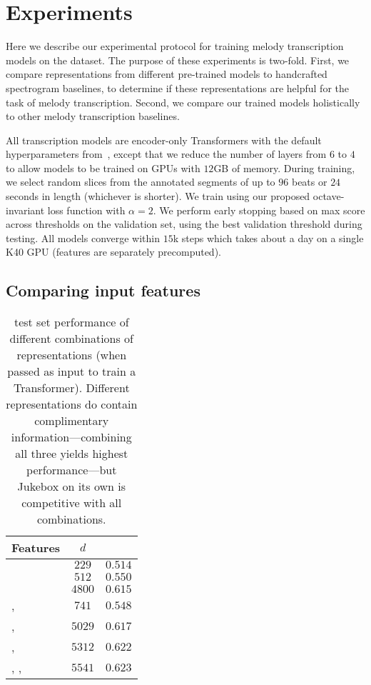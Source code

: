 \section{Experiments}
\label{sec:experiments}

Here we describe our experimental protocol for training melody transcription models on the \hooktheory{} dataset. 
The purpose of these experiments is two-fold. 
First, we compare representations from different pre-trained models to handcrafted spectrogram baselines, to determine if these representations are helpful for the task of melody transcription.  
Second, we compare our trained models holistically to other melody transcription baselines. 

All transcription models are encoder-only Transformers with the default hyperparameters from~\cite{vaswani2017attention}, 
except that we reduce the number of layers from $6$ to $4$ to allow models to be trained on GPUs with $12$GB of memory. 
During training, we select random slices from the annotated segments of up to $96$ beats or $24$ seconds in length (whichever is shorter). 
We train using our proposed octave-invariant loss function with $\alpha = 2$. 
We perform early stopping based on max \fone{} score across thresholds on the validation set, using the best validation threshold during testing. 
All models converge within $15$k steps which takes about a day on a single K40 GPU (features are separately precomputed). 

\subsection{Comparing input features}
\label{sec:exp1}

\begin{table}[t]
    \centering
    \begin{tabular}{lcc}
\toprule
Features & $d$ & \fone{} \\
\midrule
\mel{} & $229$ & $0.514$ \\
\mtthree{} & $512$ & $0.550$ \\
\jukebox{} & $4800$ & $0.615$ \\
\mel{}, \mtthree{} & $741$ & $0.548$ \\
\mel{}, \jukebox{} & $5029$ & $0.617$ \\
\mtthree{}, \jukebox{} & $5312$ & $0.622$ \\
\mel{}, \mtthree{}, \jukebox{} & $5541$ & $\mathbf{0.623}$ \\
\bottomrule
    \end{tabular}
    \caption{\hooktheory{} test set performance of different combinations of representations (when passed as input to train a Transformer). Different representations do contain complimentary information---combining all three yields highest performance---but Jukebox on its own is competitive with all combinations.}
    \label{tab:hooktheory_test}
\end{table}

